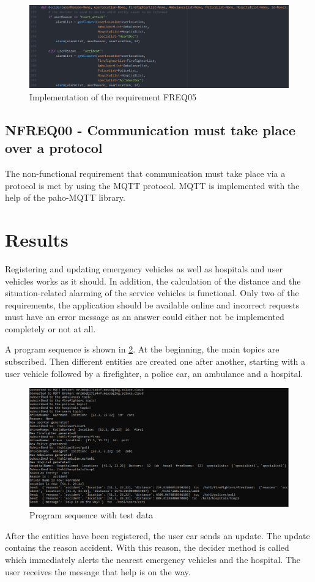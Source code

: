 \begin{figure}
\sidecaption
\includegraphics[scale=0.4]{images/walter/code/decider.png}
\caption{Implementation of the requirement FREQ05}
\label{decider}
\end{figure}


\subsection{NFREQ00 - Communication must take place over a protocol}
The non-functional requirement that communication must take place via a protocol is met by using the MQTT protocol. MQTT is implemented with the help of the paho-MQTT library.

\section{Results}
\label{sec:5}
Registering and updating emergency vehicles as well as hospitals and user vehicles works as it should. In addition, the calculation of the distance and the situation-related alarming of the service vehicles is functional. Only two of the requirements, the application should be available online and incorrect requests must have an error message as an answer could either not be implemented completely or not at all.

A program sequence is shown in \ref{console}. At the beginning, the main topics are subscribed. Then different entities are created one after another, starting with a user vehicle followed by a firefighter, a police car, an ambulance and a hospital.

\begin{figure}
\sidecaption
\includegraphics[scale=0.5]{images/walter/console.PNG}
\caption{Program sequence with test data}
\label{console}
\end{figure}
After the entities have been registered, the user car sends an update. The update contains the reason accident. With this reason, the decider method is called which immediately alerts the nearest emergency vehicles and the hospital. The user receives the message that help is on the way.

